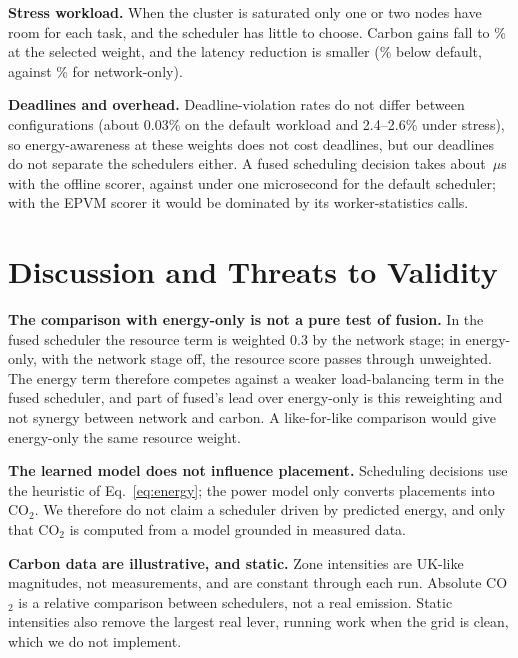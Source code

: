 \documentclass[conference]{IEEEtran}
\begin{document}
\begin{table}[t]
\centering
\caption{Mean grid intensity (g/kWh) of the nodes used, by task class (default workload).}
\label{tab:class}
\footnotesize

\end{table}

\textbf{Stress workload.} When the cluster is saturated only one or two nodes have room for each task, and the scheduler has little to choose. Carbon gains fall to \FusedCOStress\% at the selected weight, and the latency reduction is smaller (\FusedLatCutStress\% below default, against \NetLatCutStress\% for network-only).

\textbf{Deadlines and overhead.} Deadline-violation rates do not differ between configurations (about 0.03\% on the default workload and 2.4--2.6\% under stress), so energy-awareness at these weights does not cost deadlines, but our deadlines do not separate the schedulers either. A fused scheduling decision takes about \FusedDecisionUs\,$\mu$s with the offline scorer, against under one microsecond for the default scheduler; with the EPVM scorer it would be dominated by its worker-statistics calls.

\section{Discussion and Threats to Validity}
\label{sec:discussion}
\label{sec:threats}
\textbf{The comparison with energy-only is not a pure test of fusion.} In the fused scheduler the resource term is weighted $0.3$ by the network stage; in energy-only, with the network stage off, the resource score passes through unweighted. The energy term therefore competes against a weaker load-balancing term in the fused scheduler, and part of fused's lead over energy-only is this reweighting and not synergy between network and carbon. A like-for-like comparison would give energy-only the same resource weight.

\textbf{The learned model does not influence placement.} Scheduling decisions use the heuristic of Eq.~\eqref{eq:energy}; the power model only converts placements into CO$_2$. We therefore do not claim a scheduler driven by predicted energy, and only that CO$_2$ is computed from a model grounded in measured data.

\textbf{Carbon data are illustrative, and static.} Zone intensities are UK-like magnitudes, not measurements, and are constant through each run. Absolute CO$_2$ is a relative comparison between schedulers, not a real emission. Static intensities also remove the largest real lever, running work when the grid is clean, which we do not implement.
\end{document}
